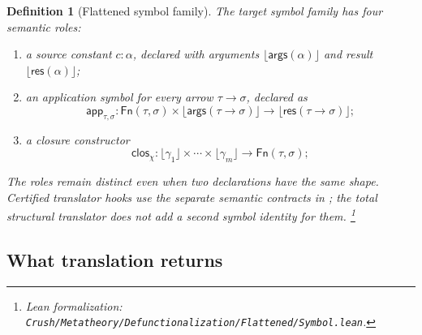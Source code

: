 \documentclass[11pt]{article}
\newtheorem{definition}{Definition}[section]
\theoremstyle{remark}
\newcommand{\leanfile}[1]{\footnote{Lean formalization: \texttt{Crush/Metatheory/#1}.}}
\newcommand{\Fn}{\mathsf{Fn}}
\newcommand{\clos}{\mathsf{clos}}
\newcommand{\app}{\mathsf{app}}
\newcommand{\erase}[1]{\lfloor #1\rfloor}
\newcommand{\args}{\mathsf{args}}
\newcommand{\res}{\mathsf{res}}
\begin{document}
\begin{definition}[Flattened symbol family]
The target symbol family has four semantic roles:
\begin{enumerate}[leftmargin=*]
 \item a source constant $c:\alpha$, declared with arguments
       $\erase{\args(\alpha)}$ and result $\erase{\res(\alpha)}$;
 \item an application symbol for every arrow $\tau\to\sigma$, declared as
       \[
       \app_{\tau,\sigma}:
       \Fn(\tau,\sigma)\times
       \erase{\args(\tau\to\sigma)}
       \longrightarrow\erase{\res(\tau\to\sigma)};
       \]
 \item a closure constructor
       \[
       \clos_\chi:
       \erase{\gamma_1}\times\cdots\times\erase{\gamma_m}
       \longrightarrow\Fn(\tau,\sigma);
       \]
\end{enumerate}
The roles remain distinct even when two declarations have the same shape.
Certified translator hooks use the separate semantic contracts in
; the total structural translator does not add a second symbol
identity for them.
\leanfile{Defunctionalization/Flattened/Symbol.lean}
\end{definition}

\subsection{What translation returns}
\end{document}
